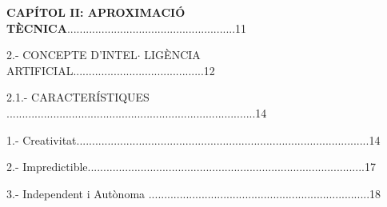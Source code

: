 \documentclass[12pt]{article}
\renewcommand{\_}{\kern-1.5pt\textunderscore\kern-1.5pt}
\begin{document}
\vspace{\baselineskip}
\begin{justify}
\textbf{CAPÍTOL II: APROXIMACIÓ TÈCNICA}......................................................11
\end{justify}\par


\vspace{\baselineskip}

\vspace{\baselineskip}
\begin{justify}
2.- CONCEPTE D’INTEL$ \cdot $ LIGÈNCIA ARTIFICIAL..........................................12
\end{justify}\par


\vspace{\baselineskip}
\begin{justify}
2.1.- CARACTERÍSTIQUES ................................................................................14
\end{justify}\par


\vspace{\baselineskip}

\vspace{\baselineskip}
\begin{adjustwidth}{0.49in}{0.0in}
1.- Creativitat..............................................................................................14\par

\end{adjustwidth}


\vspace{\baselineskip}
\begin{adjustwidth}{0.49in}{0.0in}
2.- Impredictible.........................................................................................17\par

\end{adjustwidth}


\vspace{\baselineskip}
\begin{adjustwidth}{0.49in}{0.0in}
3.- Independent i Autònoma .......................................................................18\par

\end{adjustwidth}


\vspace{\baselineskip}
\end{document}
